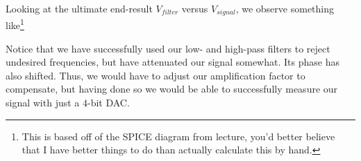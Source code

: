 \documentclass[letterpaper]{article}
\theoremstyle{remark}
\begin{document}
Looking at the ultimate end-result $V_{filter}$ versus $V_{signal}$, we observe something like\footnote{This is based off of the SPICE diagram from lecture, you'd better believe that I have better things to do than actually calculate this by hand.}
\begin{center}
\end{center}

Notice that we have successfully used our low- and high-pass filters to reject undesired frequencies, but have attenuated our signal somewhat. Its phase has also shifted. Thus, we would have to adjust our amplification factor to compensate, but having done so we would be able to successfully measure our signal with just a $4$-bit DAC.
\end{document}
